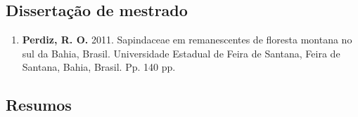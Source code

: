 \documentclass[11pt, a4paper]{awesome-cv}
\providecommand{\tightlist}{%
	\setlength{\itemsep}{0pt}\setlength{\parskip}{0pt}}
\begin{document}
\hypertarget{dissertauxe7uxe3o-de-mestrado}{%
\subsection{Dissertação de mestrado}\label{dissertauxe7uxe3o-de-mestrado}}

\begin{enumerate}
\def\labelenumi{(\arabic{enumi})}
\tightlist
\item
  \textbf{Perdiz, R. O.} 2011. Sapindaceae em remanescentes de floresta montana no sul da Bahia, Brasil. Universidade Estadual de Feira de Santana, Feira de Santana, Bahia, Brasil. Pp. 140 pp.~
\end{enumerate}

\hypertarget{resumos}{%
\subsection{Resumos}\label{resumos}}
\end{document}

